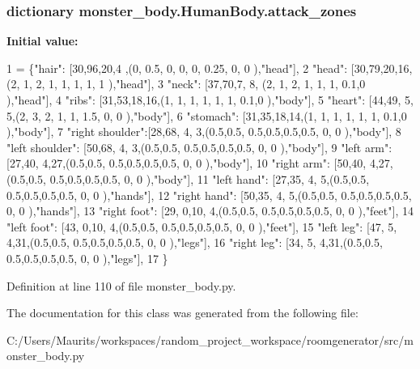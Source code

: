 \subsubsection[{attack\+\_\+zones}]{\setlength{\rightskip}{0pt plus 5cm}dictionary monster\+\_\+body.\+Human\+Body.\+attack\+\_\+zones\hspace{0.3cm}{\ttfamily [static]}}\label{classmonster__body_1_1_human_body_af5bf86c3f28ea100ade2f2fbf1fe7f5e}
{\bfseries Initial value\+:}
\begin{DoxyCode}
1 = \{\textcolor{stringliteral}{"hair"}:          [30,96,20,4 ,(0,  0.5, 0,  0,  0,  0.25, 0,  0 ),\textcolor{stringliteral}{"head"}],
2                   \textcolor{stringliteral}{"head"}:          [30,79,20,16,(2,  1,   2,  1,  1,  1,    1,  1 ),\textcolor{stringliteral}{"head"}],
3                   \textcolor{stringliteral}{"neck"}:          [37,70,7, 8, (2,  1,   2,  1,  1,  1,    0.1,0 ),\textcolor{stringliteral}{"head"}],
4                   \textcolor{stringliteral}{"ribs"}:          [31,53,18,16,(1,  1,   1,  1,  1,  1,    0.1,0 ),\textcolor{stringliteral}{"body"}],
5                   \textcolor{stringliteral}{"heart"}:         [44,49, 5, 5,(2,  3,   2,  1,  1,  1.5,  0,  0 ),\textcolor{stringliteral}{"body"}],
6                   \textcolor{stringliteral}{"stomach"}:       [31,35,18,14,(1,  1,   1,  1,  1,  1,    0.1,0 ),\textcolor{stringliteral}{"body"}],
7                   \textcolor{stringliteral}{"right shoulder"}:[28,68, 4, 3,(0.5,0.5, 0.5,0.5,0.5,0.5,  0,  0 ),\textcolor{stringliteral}{"body"}],
8                   \textcolor{stringliteral}{"left shoulder"}: [50,68, 4, 3,(0.5,0.5, 0.5,0.5,0.5,0.5,  0,  0 ),\textcolor{stringliteral}{"body"}],
9                   \textcolor{stringliteral}{"left arm"}:      [27,40, 4,27,(0.5,0.5, 0.5,0.5,0.5,0.5,  0,  0 ),\textcolor{stringliteral}{"body"}],
10                   \textcolor{stringliteral}{"right arm"}:     [50,40, 4,27,(0.5,0.5, 0.5,0.5,0.5,0.5,  0,  0 ),\textcolor{stringliteral}{"body"}],
11                   \textcolor{stringliteral}{"left hand"}:     [27,35, 4, 5,(0.5,0.5, 0.5,0.5,0.5,0.5,  0,  0 ),\textcolor{stringliteral}{"hands"}],
12                   \textcolor{stringliteral}{"right hand"}:    [50,35, 4, 5,(0.5,0.5, 0.5,0.5,0.5,0.5,  0,  0 ),\textcolor{stringliteral}{"hands"}],
13                   \textcolor{stringliteral}{"right foot"}:    [29, 0,10, 4,(0.5,0.5, 0.5,0.5,0.5,0.5,  0,  0 ),\textcolor{stringliteral}{"feet"}],
14                   \textcolor{stringliteral}{"left foot"}:     [43, 0,10, 4,(0.5,0.5, 0.5,0.5,0.5,0.5,  0,  0 ),\textcolor{stringliteral}{"feet"}],
15                   \textcolor{stringliteral}{"left leg"}:      [47, 5, 4,31,(0.5,0.5, 0.5,0.5,0.5,0.5,  0,  0 ),\textcolor{stringliteral}{"legs"}],
16                   \textcolor{stringliteral}{"right leg"}:     [34, 5, 4,31,(0.5,0.5, 0.5,0.5,0.5,0.5,  0,  0 ),\textcolor{stringliteral}{"legs"}],
17                   \}
\end{DoxyCode}


Definition at line 110 of file monster\+\_\+body.\+py.



The documentation for this class was generated from the following file\+:\begin{DoxyCompactItemize}
\item 
C\+:/\+Users/\+Maurits/workspaces/random\+\_\+project\+\_\+workspace/roomgenerator/src/monster\+\_\+body.\+py\end{DoxyCompactItemize}
